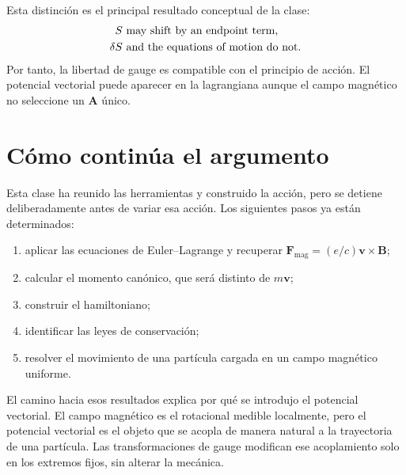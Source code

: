Esta distinción es el principal resultado conceptual de la clase:
\begin{equation}
  \begin{aligned}
    S&\ \hbox{may shift by an endpoint term},\\
    \delta S&\ \hbox{and the equations of motion do not}.
  \end{aligned}
\end{equation}
Por tanto, la libertad de gauge es compatible con el principio de acción. El potencial vectorial puede aparecer en la lagrangiana aunque el campo magnético no seleccione un \(\mathbf A\) único.

\section{Cómo continúa el argumento}

Esta clase ha reunido las herramientas y construido la acción, pero se detiene deliberadamente antes de variar esa acción. Los siguientes pasos ya están determinados:
\begin{enumerate}
  \item aplicar las ecuaciones de Euler--Lagrange y recuperar
  \(\mathbf F_{\mathrm{mag}}=(e/c)\mathbf v\times\mathbf B\);
  \item calcular el momento canónico, que será distinto de \(m\mathbf v\);
  \item construir el hamiltoniano;
  \item identificar las leyes de conservación;
  \item resolver el movimiento de una partícula cargada en un campo magnético uniforme.
\end{enumerate}

El camino hacia esos resultados explica por qué se introdujo el potencial vectorial. El campo magnético es el rotacional medible localmente, pero el potencial vectorial es el objeto que se acopla de manera natural a la trayectoria de una partícula. Las transformaciones de gauge modifican ese acoplamiento solo en los extremos fijos, sin alterar la mecánica.